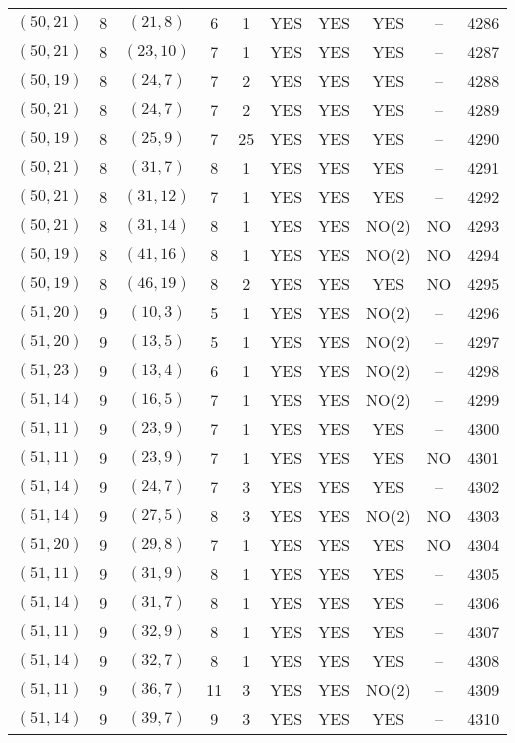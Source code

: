 \begin{longtable}{|c|c|c|c|c|c|c|c|c|c|}
$(50, 21)$ & 8 & $(21, 8)$ & 6 & 1 & YES & YES & YES & -- & 4286\\
$(50, 21)$ & 8 & $(23, 10)$ & 7 & 1 & YES & YES & YES & -- & 4287\\
$(50, 19)$ & 8 & $(24, 7)$ & 7 & 2 & YES & YES & YES & -- & 4288\\
$(50, 21)$ & 8 & $(24, 7)$ & 7 & 2 & YES & YES & YES & -- & 4289\\
$(50, 19)$ & 8 & $(25, 9)$ & 7 & 25 & YES & YES & YES & -- & 4290\\
$(50, 21)$ & 8 & $(31, 7)$ & 8 & 1 & YES & YES & YES & -- & 4291\\
$(50, 21)$ & 8 & $(31, 12)$ & 7 & 1 & YES & YES & YES & -- & 4292\\
$(50, 21)$ & 8 & $(31, 14)$ & 8 & 1 & YES & YES & NO(2) & NO & 4293\\
$(50, 19)$ & 8 & $(41, 16)$ & 8 & 1 & YES & YES & NO(2) & NO & 4294\\
$(50, 19)$ & 8 & $(46, 19)$ & 8 & 2 & YES & YES & YES & NO & 4295\\
$(51, 20)$ & 9 & $(10, 3)$ & 5 & 1 & YES & YES & NO(2) & -- & 4296\\
$(51, 20)$ & 9 & $(13, 5)$ & 5 & 1 & YES & YES & NO(2) & -- & 4297\\
$(51, 23)$ & 9 & $(13, 4)$ & 6 & 1 & YES & YES & NO(2) & -- & 4298\\
$(51, 14)$ & 9 & $(16, 5)$ & 7 & 1 & YES & YES & NO(2) & -- & 4299\\
$(51, 11)$ & 9 & $(23, 9)$ & 7 & 1 & YES & YES & YES & -- & 4300\\
$(51, 11)$ & 9 & $(23, 9)$ & 7 & 1 & YES & YES & YES & NO & 4301\\
$(51, 14)$ & 9 & $(24, 7)$ & 7 & 3 & YES & YES & YES & -- & 4302\\
$(51, 14)$ & 9 & $(27, 5)$ & 8 & 3 & YES & YES & NO(2) & NO & 4303\\
$(51, 20)$ & 9 & $(29, 8)$ & 7 & 1 & YES & YES & YES & NO & 4304\\
$(51, 11)$ & 9 & $(31, 9)$ & 8 & 1 & YES & YES & YES & -- & 4305\\
$(51, 14)$ & 9 & $(31, 7)$ & 8 & 1 & YES & YES & YES & -- & 4306\\
$(51, 11)$ & 9 & $(32, 9)$ & 8 & 1 & YES & YES & YES & -- & 4307\\
$(51, 14)$ & 9 & $(32, 7)$ & 8 & 1 & YES & YES & YES & -- & 4308\\
$(51, 11)$ & 9 & $(36, 7)$ & 11 & 3 & YES & YES & NO(2) & -- & 4309\\
$(51, 14)$ & 9 & $(39, 7)$ & 9 & 3 & YES & YES & YES & -- & 4310\\

\end{longtable}
